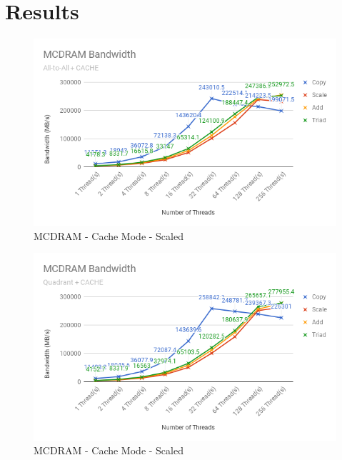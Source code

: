 \documentclass[bsc,frontabs,twoside,singlespacing,parskip,deptreport]{infthesis}     %
\begin{document}
\newpage
\section{Results}

\begin{figure}[!h]
    \centering
    \includegraphics[width=\textwidth]{Results/mcdram_a2a_c_scaled.png}
    \caption{MCDRAM - Cache Mode - Scaled}
    \label{res:mcdram-a2a-c-scaled}
\end{figure}

\begin{figure}[!h]
    \centering
    \includegraphics[width=\textwidth]{Results/mcdram_quad_c_scaled.png}
    \caption{MCDRAM - Cache Mode - Scaled}
    \label{res:mcdram-quad-c-scaled}
\end{figure}
\end{document}
